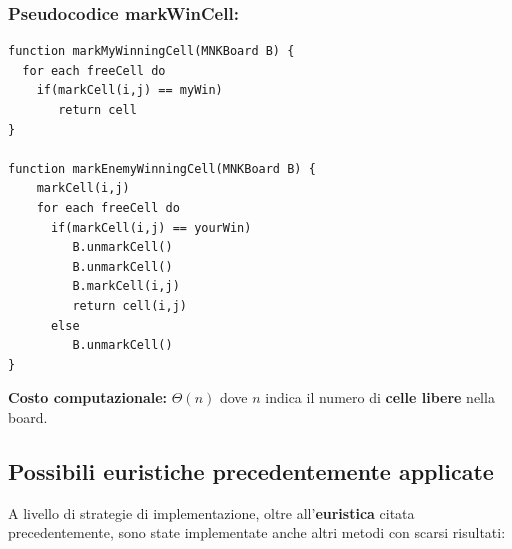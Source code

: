 \documentclass{article}
\begin{document}
    \subsubsection{Pseudocodice markWinCell:}
    \lstset{language=java}
    \begin{lstlisting}[frame=single]  
function markMyWinningCell(MNKBoard B) {
  for each freeCell do
    if(markCell(i,j) == myWin) 
       return cell
}

function markEnemyWinningCell(MNKBoard B) {
    markCell(i,j)
    for each freeCell do
      if(markCell(i,j) == yourWin) 
         B.unmarkCell()
         B.unmarkCell()	       
         B.markCell(i,j)   
         return cell(i,j)
      else 
         B.unmarkCell()       
}

    \end{lstlisting}
        
        \textbf{Costo computazionale:} $\Theta(n)$ dove $n$ indica il numero di \textbf{celle libere} nella board. 
        
        
    
 \newpage
     \subsection{Possibili euristiche precedentemente applicate}
    A livello di strategie di implementazione, oltre all'\textbf{euristica} citata precedentemente, sono state implementate anche altri metodi con scarsi risultati:
    
\end{document}
